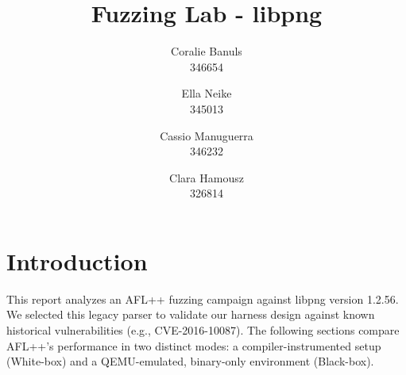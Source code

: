 \usepackage{filecontents}




\date{}

\title{\Large \bf Fuzzing Lab - libpng}

\author{
{\rm Coralie Banuls}\\
346654
\and
{\rm Ella Neike}\\
345013
\and
{\rm Cassio Manuguerra}\\
346232
\and
{\rm Clara Hamousz}\\
326814
} %

\maketitle



\section{Introduction}
\vspace{-7pt}

This report analyzes an AFL++ fuzzing campaign against libpng version 1.2.56. We selected this legacy parser to validate our harness design against known historical vulnerabilities (e.g., CVE-2016-10087). The following sections compare AFL++’s performance in two distinct modes: a compiler-instrumented setup (White-box) and a QEMU-emulated, binary-only environment (Black-box).

